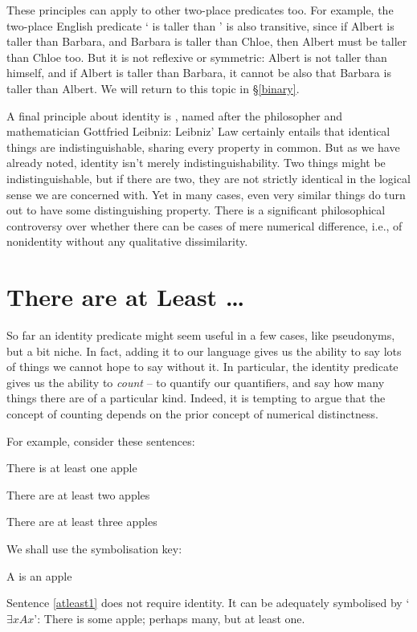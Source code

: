 These principles can apply to other two-place predicates too. For example, the two-place English predicate ` is taller than ' is also transitive, since if Albert is taller than Barbara, and Barbara is taller than Chloe, then Albert must be taller than Chloe too. But it is not reflexive or symmetric: Albert is not taller than himself, and if Albert is taller than Barbara, it cannot be also that Barbara is taller than Albert. We will return to this topic in §\ref{binary}.

A final principle about identity is , named after the philosopher and mathematician Gottfried Leibniz:  
Leibniz' Law certainly entails that identical things are indistinguishable, sharing every property in common. But as we have already noted, identity isn't merely indistinguishability. Two things might be indistinguishable, but if there are two, they are not strictly identical in the logical sense we are concerned with. Yet in many cases, even very similar things do turn out to have some distinguishing property. There is a significant philosophical controversy over whether there can be cases of mere numerical difference, i.e., of nonidentity without any qualitative dissimilarity. 




\section{There are at Least …}

So far an identity predicate might seem useful in a few cases, like pseudonyms, but a bit niche. In fact, adding it to our language gives us the ability to say lots of things we cannot hope to say without it. In particular, the identity predicate gives us the ability to \emph{count} – to quantify our quantifiers, and say how many things there are of a particular kind. Indeed, it is tempting to argue that the concept of counting depends on the prior concept of numerical distinctness.

For example, consider these sentences:
\begin{earg}
\item[\ex{atleast1}] There is at least one apple
\item[\ex{atleast2}] There are at least two apples
\item[\ex{atleast3}] There are at least three apples
\end{earg}
We shall use the symbolisation key:
	\begin{ekey}
		\item[A]  is an apple
	\end{ekey}
Sentence \ref{atleast1} does not require identity. It can be adequately symbolised by `$\exists x Ax$': There is some apple; perhaps many, but at least one.

